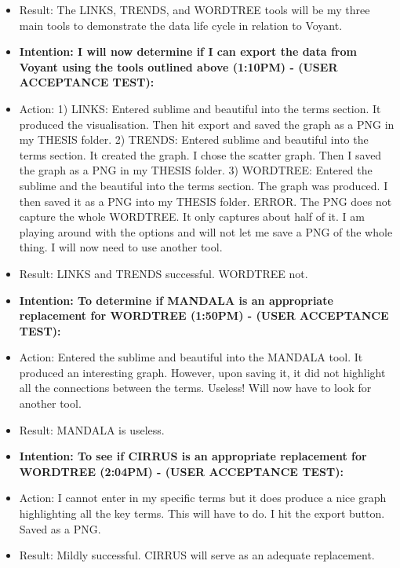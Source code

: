 \documentclass[a4paper,12pt]{article}
\begin{document}
\begin{itemize}
\item Result: The LINKS, TRENDS, and WORDTREE tools will be my three main tools to demonstrate the data life cycle in relation to Voyant. 


\item \textbf{Intention: I will now determine if I can export the data from Voyant using the tools outlined above (1:10PM) - (USER ACCEPTANCE TEST):}


\item Action: 1) LINKS: Entered sublime and beautiful into the terms section. It produced the visualisation. Then hit export and saved the graph as a PNG in my THESIS folder. 2) TRENDS: Entered sublime and beautiful into the terms section. It created the graph. I chose the scatter graph. Then I saved the graph as a PNG in my THESIS folder. 3) WORDTREE: Entered the sublime and the beautiful into the terms section. The graph was produced. I then saved it as a PNG into my THESIS folder. ERROR. The PNG does not capture the whole WORDTREE. It only captures about half of it. I am playing around with the options and will not let me save a PNG of the whole thing. I will now need to use another tool. 


\item Result: LINKS and TRENDS successful. WORDTREE not. 


\item \textbf{Intention: To determine if MANDALA is an appropriate replacement for WORDTREE (1:50PM) - (USER ACCEPTANCE TEST):}


\item Action: Entered the sublime and beautiful into the MANDALA tool. It produced an interesting graph. However, upon saving it, it did not highlight all the connections between the terms. Useless! Will now have to look for another tool.


\item Result: MANDALA is useless. 


\item \textbf{Intention: To see if CIRRUS is an appropriate replacement for WORDTREE (2:04PM) - (USER ACCEPTANCE TEST):}


\item Action: I cannot enter in my specific terms but it does produce a nice graph highlighting all the key terms. This will have to do. I hit the export button. Saved as a PNG. 


\item Result: Mildly successful. CIRRUS will serve as an adequate replacement. 



\end{itemize}
\end{document}
